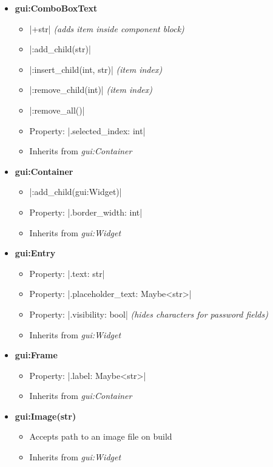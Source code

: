 \documentclass[11pt]{report}
\begin{document}
\begin{multicols}{2}
\begin{itemize}[topsep=0pt,leftmargin=*]
    \item \textbf{gui:ComboBoxText}
    \begin{itemize}[nosep,topsep=0pt,leftmargin=*]
    \item |+str| \emph{(adds item inside component block)}
    \item |:add_child(str)|
    \item |:insert_child(int, str)| \emph{(item index)}
    \item |:remove_child(int)| \emph{(item index)}
    \item |:remove_all()|
    \item Property: |.selected_index: int|
    \item Inherits from \emph{gui:Container}
    \end{itemize}
    \item \textbf{gui:Container}
    \begin{itemize}[nosep,topsep=0pt,leftmargin=*]
    \item |:add_child(gui:Widget)|
    \item Property: |.border_width: int|
    \item Inherits from \emph{gui:Widget}
    \end{itemize}
    \item \textbf{gui:Entry}
    \begin{itemize}[nosep,topsep=0pt,leftmargin=*]
    \item Property: |.text: str|
    \item Property: |.placeholder_text: Maybe<str>|
    \item Property: |.visibility: bool| \emph{(hides characters for password fields)}
    \item Inherits from \emph{gui:Widget}
    \end{itemize}
    \item \textbf{gui:Frame}
    \begin{itemize}[nosep,topsep=0pt,leftmargin=*]
    \item Property: |.label: Maybe<str>|
    \item Inherits from \emph{gui:Container}
    \end{itemize}
    \item \textbf{gui:Image(str)}
    \begin{itemize}[nosep,topsep=0pt,leftmargin=*]
    \item Accepts path to an image file on build
    \item Inherits from \emph{gui:Widget}
    \end{itemize}

\end{itemize}
\end{multicols}
\end{document}
